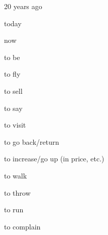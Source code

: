 \documentclass[avery5371,grid,frame]{flashcards}
\begin{document}
\begin{flashcard}{\LARGE 20 years ago}
\LARGE {}
\end{flashcard}
\begin{flashcard}{\LARGE today}
\LARGE {}
\end{flashcard}
\begin{flashcard}{\LARGE now}
\LARGE {}
\end{flashcard}
\begin{flashcard}{\LARGE to be}
\LARGE {}
\end{flashcard}
\begin{flashcard}{\LARGE to fly}
\LARGE {}
\end{flashcard}
\begin{flashcard}{\LARGE to sell}
\LARGE {}
\end{flashcard}
\begin{flashcard}{\LARGE to say}
\LARGE {}
\end{flashcard}
\begin{flashcard}{\LARGE to visit}
\LARGE {}
\end{flashcard}
\begin{flashcard}{\LARGE to go back/return}
\LARGE {}
\end{flashcard}
\begin{flashcard}{\LARGE to increase/go up (in price, etc.)}
\LARGE {}
\end{flashcard}
\begin{flashcard}{\LARGE to walk}
\LARGE {}
\end{flashcard}
\begin{flashcard}{\LARGE to throw}
\LARGE {}
\end{flashcard}
\begin{flashcard}{\LARGE to run}
\LARGE {}
\end{flashcard}
\begin{flashcard}{\LARGE to complain}
\LARGE {}
\end{flashcard}
\end{document}
